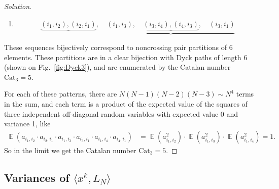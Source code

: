 \documentclass[letterpaper,11pt,oneside,reqno]{amsart}
\numberwithin{equation}{section}
\DeclareMathOperator{\EE}{\mathbb{E}}
\theoremstyle{definition}
\begin{document}
\begin{proof}[Solution]
\begin{enumerate}
	\item
	\begin{equation*}
	\underbrace{ ( i_1, i_2 ) , ( i_2 , i_1 ) } , \quad \underbrace{ ( i_1, i_3 ) , \quad \underbrace{ ( i_3, i_4 ) , ( i_4, i_3 ) } , \quad ( i_3, i_1 ) }
	\end{equation*}

	\end{enumerate}

	These sequences bijectively correspond to noncrossing pair partitions of 6 elements.
	These partitions are in a clear bijection with Dyck paths of length 6
	(shown on Fig.~\ref{fig:Dyck3}), and are enumerated by the Catalan number $\mathrm{Cat}_3=5$.

	For each of these patterns, there are $ N ( N - 1 ) ( N - 2 ) ( N - 3 ) \sim N^4 $ terms in the sum, and each term is a product of the expected value of the squares of three independent off-diagonal random variables with expected value 0 and variance 1, like
	\begin{align*}
	\EE ( a_{ i_1, i_2 } \cdot a_{ i_2 , i_1 } \cdot a_{ i_1, i_3 } \cdot a_{ i_3, i_1 } \cdot a_{ i_1, i_4 } \cdot a_{ i_4, i_1 } ) &= \EE( a_{ i_1, i_2 }^2 ) \cdot \EE( a_{ i_1, i_3 }^2 ) \cdot \EE( a_{ i_1, i_4 }^2 ) = 1.
	\end{align*}
	So in the limit we get the Catalan number $ \mathrm{Cat}_3 = 5 $.
\end{proof}


\subsection{Variances of $\langle x^k,L_N\rangle$} %
\label{sub:variances_langle_x_k_l_nrangleto0_}
\end{document}
